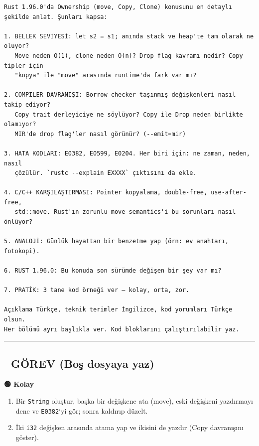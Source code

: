 \documentclass[12pt,a4paper]{article}
\begin{document}
\begin{verbatim}
Rust 1.96.0'da Ownership (move, Copy, Clone) konusunu en detaylı şekilde anlat. Şunları kapsa:

1. BELLEK SEVİYESİ: let s2 = s1; anında stack ve heap'te tam olarak ne oluyor?
   Move neden O(1), clone neden O(n)? Drop flag kavramı nedir? Copy tipler için
   "kopya" ile "move" arasında runtime'da fark var mı?

2. COMPILER DAVRANIŞI: Borrow checker taşınmış değişkenleri nasıl takip ediyor?
   Copy trait derleyiciye ne söylüyor? Copy ile Drop neden birlikte olamıyor?
   MIR'de drop flag'ler nasıl görünür? (--emit=mir)

3. HATA KODLARI: E0382, E0599, E0204. Her biri için: ne zaman, neden, nasıl
   çözülür. `rustc --explain EXXXX` çıktısını da ekle.

4. C/C++ KARŞILAŞTIRMASI: Pointer kopyalama, double-free, use-after-free,
   std::move. Rust'ın zorunlu move semantics'i bu sorunları nasıl önlüyor?

5. ANALOJİ: Günlük hayattan bir benzetme yap (örn: ev anahtarı, fotokopi).

6. RUST 1.96.0: Bu konuda son sürümde değişen bir şey var mı?

7. PRATİK: 3 tane kod örneği ver — kolay, orta, zor.

Açıklama Türkçe, teknik terimler İngilizce, kod yorumları Türkçe olsun.
Her bölümü ayrı başlıkla ver. Kod bloklarını çalıştırılabilir yaz.
\end{verbatim}

\begin{center}\rule{0.5\linewidth}{0.5pt}\end{center}

\subsection{📝 GÖREV (Boş dosyaya yaz)}\label{görev-boş-dosyaya-yaz-9}

\textbf{🟢 Kolay}

\begin{enumerate}
\def\labelenumi{\arabic{enumi}.}
\tightlist
\item
  Bir \texttt{String} oluştur, başka bir değişkene ata (move), eski değişkeni yazdırmayı dene ve \texttt{E0382}`yi gör; sonra kaldırıp düzelt.
\item
  İki \texttt{i32} değişken arasında atama yap ve ikisini de yazdır (Copy davranışını göster).
\end{enumerate}
\end{document}
